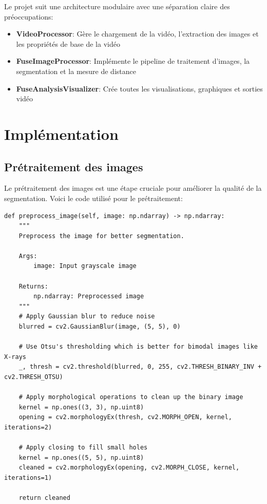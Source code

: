 \documentclass[12pt,a4paper]{article}
\begin{document}
Le projet suit une architecture modulaire avec une séparation claire des préoccupations:

\begin{itemize}
    \item \textbf{VideoProcessor}: Gère le chargement de la vidéo, l'extraction des images et les propriétés de base de la vidéo
    \item \textbf{FuseImageProcessor}: Implémente le pipeline de traitement d'images, la segmentation et la mesure de distance
    \item \textbf{FuseAnalysisVisualizer}: Crée toutes les visualisations, graphiques et sorties vidéo
\end{itemize}

\section{Implémentation}

\subsection{Prétraitement des images}

Le prétraitement des images est une étape cruciale pour améliorer la qualité de la segmentation. Voici le code utilisé pour le prétraitement:

\begin{lstlisting}
def preprocess_image(self, image: np.ndarray) -> np.ndarray:
    """
    Preprocess the image for better segmentation.
    
    Args:
        image: Input grayscale image
        
    Returns:
        np.ndarray: Preprocessed image
    """
    # Apply Gaussian blur to reduce noise
    blurred = cv2.GaussianBlur(image, (5, 5), 0)
    
    # Use Otsu's thresholding which is better for bimodal images like X-rays
    _, thresh = cv2.threshold(blurred, 0, 255, cv2.THRESH_BINARY_INV + cv2.THRESH_OTSU)
    
    # Apply morphological operations to clean up the binary image
    kernel = np.ones((3, 3), np.uint8)
    opening = cv2.morphologyEx(thresh, cv2.MORPH_OPEN, kernel, iterations=2)
    
    # Apply closing to fill small holes
    kernel = np.ones((5, 5), np.uint8)
    cleaned = cv2.morphologyEx(opening, cv2.MORPH_CLOSE, kernel, iterations=1)
    
    return cleaned
\end{lstlisting}
\end{document}
